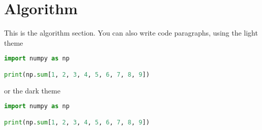 \section{Algorithm}
\label{sec:algorithm}

This is the algorithm section. You can also write code paragraphs, using the light theme

\begin{lstlisting}[language=Python]
import numpy as np

print(np.sum[1, 2, 3, 4, 5, 6, 7, 8, 9])
\end{lstlisting}

or the dark theme

\begin{lstlisting}[language=Python, style=dark]
import numpy as np

print(np.sum[1, 2, 3, 4, 5, 6, 7, 8, 9])
\end{lstlisting}

\lipsum